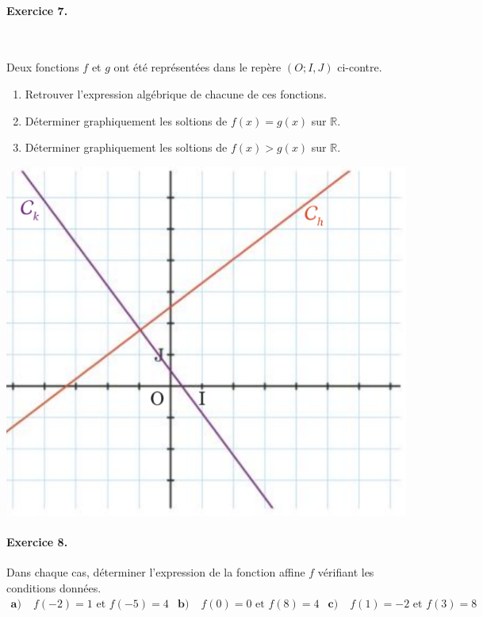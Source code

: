 \documentclass[11pt]{article}
\begin{document}
\paragraph{Exercice 7.}~\\
\begin{minipage}[]{.7\textwidth}
  Deux fonctions $f$ et $g$ ont été représentées dans le repère $(O; I, J)$
  ci-contre.
  \begin{enumerate}
    \item Retrouver l'expression algébrique de chacune de ces fonctions.
    \item Déterminer graphiquement les soltions de $f(x)=g(x)$ sur $\mathbb{R}$.
    \item Déterminer graphiquement les soltions de $f(x)>g(x)$ sur $\mathbb{R}$.
  \end{enumerate}
\end{minipage}
\begin{minipage}[]{.3\textwidth}
  \begin{center}
    \includegraphics[scale=.25]{exo4.png}
  \end{center}
\end{minipage}

\paragraph{Exercice 8.} Dans chaque cas, déterminer l'expression de la fonction
affine $f$ vérifiant les conditions données.
\begin{align*}
  \textbf{a)}\;& f(-2)=1\text{ et }f(-5)=4 &
  \textbf{b)}\;& f(0)=0\text{ et }f(8)=4 &
  \textbf{c)}\;& f(1)=-2\text{ et }f(3)=8
\end{align*}
\end{document}

